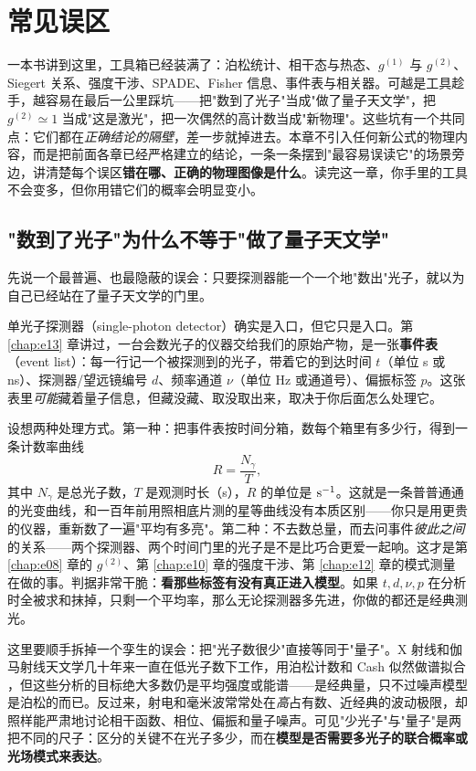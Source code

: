 \chapter{常见误区}
\label{chap:e27}

\begin{chapteropening}
一本书讲到这里，工具箱已经装满了：泊松统计、相干态与热态、\(g^{(1)}\) 与 \(g^{(2)}\)、Siegert 关系、强度干涉、SPADE、Fisher 信息、事件表与相关器。可越是工具趁手，越容易在最后一公里踩坑——把"数到了光子"当成"做了量子天文学"，把 \(g^{(2)}\simeq1\) 当成"这是激光"，把一次偶然的高计数当成"新物理"。这些坑有一个共同点：它们都在\emph{正确结论的隔壁}，差一步就掉进去。本章不引入任何新公式的物理内容，而是把前面各章已经严格建立的结论，一条一条摆到"最容易误读它"的场景旁边，讲清楚每个误区\textbf{错在哪、正确的物理图像是什么}。读完这一章，你手里的工具不会变多，但你用错它们的概率会明显变小。
\end{chapteropening}


\section{"数到了光子"为什么不等于"做了量子天文学"}
\label{sec:e27-photon-not-quantum}

先说一个最普遍、也最隐蔽的误会：只要探测器能一个一个地"数出"光子，就以为自己已经站在了量子天文学的门里。

单光子探测器（single-photon detector）确实是入口，但它只是入口。第 \ref{chap:e13} 章讲过，一台会数光子的仪器交给我们的原始产物，是一张\textbf{事件表}（event list）：每一行记一个被探测到的光子，带着它的到达时间 \(t\)（单位 s 或 ns）、探测器/望远镜编号 \(d\)、频率通道 \(\nu\)（单位 Hz 或通道号）、偏振标签 \(p\)。这张表里\emph{可能}藏着量子信息，但藏没藏、取没取出来，取决于你后面怎么处理它。

设想两种处理方式。第一种：把事件表按时间分箱，数每个箱里有多少行，得到一条计数率曲线
\[
  R=\frac{N_\gamma}{T},
\]
其中 \(N_\gamma\) 是总光子数，\(T\) 是观测时长（s），\(R\) 的单位是 \({\rm s}^{-1}\)。这就是一条普普通通的光变曲线，和一百年前用照相底片测的星等曲线没有本质区别——你只是用更贵的仪器，重新数了一遍"平均有多亮"。第二种：不去数总量，而去问事件\emph{彼此之间}的关系——两个探测器、两个时间门里的光子是不是比巧合更爱一起响。这才是第 \ref{chap:e08} 章的 \(g^{(2)}\)、第 \ref{chap:e10} 章的强度干涉、第 \ref{chap:e12} 章的模式测量在做的事。判据非常干脆：\textbf{看那些标签有没有真正进入模型}。如果 \(t,d,\nu,p\) 在分析时全被求和抹掉，只剩一个平均率，那么无论探测器多先进，你做的都还是经典测光。

这里要顺手拆掉一个孪生的误会：把"光子数很少"直接等同于"量子"。X 射线和伽马射线天文学几十年来一直在低光子数下工作，用泊松计数和 Cash 似然做谱拟合 \citep{1979ApJ...228..939C,1986ApJ...303..336G}，但这些分析的目标绝大多数仍是平均强度或能谱——是经典量，只不过噪声模型是泊松的而已。反过来，射电和毫米波常常处在\emph{高}占有数、近经典的波动极限，却照样能严肃地讨论相干函数、相位、偏振和量子噪声。可见"少光子"与"量子"是两把不同的尺子：区分的关键不在光子多少，而在\textbf{模型是否需要多光子的联合概率或光场模式来表达}。

